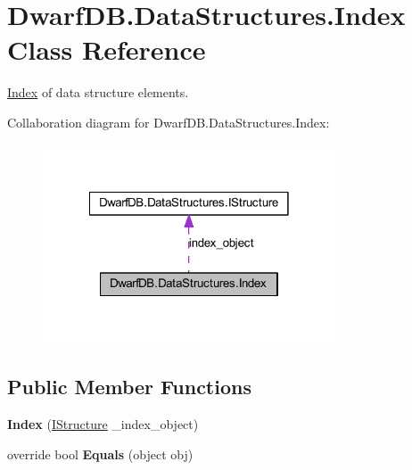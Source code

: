 \hypertarget{class_dwarf_d_b_1_1_data_structures_1_1_index}{
\section{DwarfDB.DataStructures.Index Class Reference}
\label{class_dwarf_d_b_1_1_data_structures_1_1_index}
}


\hyperlink{class_dwarf_d_b_1_1_data_structures_1_1_index}{Index} of data structure elements.  




Collaboration diagram for DwarfDB.DataStructures.Index:
\nopagebreak
\begin{figure}[H]
\begin{center}
\leavevmode
\includegraphics[width=246pt]{class_dwarf_d_b_1_1_data_structures_1_1_index__coll__graph}
\end{center}
\end{figure}
\subsection*{Public Member Functions}
\begin{DoxyCompactItemize}
\item 
\hypertarget{class_dwarf_d_b_1_1_data_structures_1_1_index_a2481d361d4dbf7cb81f094a834b93214}{
{\bfseries Index} (\hyperlink{interface_dwarf_d_b_1_1_data_structures_1_1_i_structure}{IStructure} \_\-index\_\-object)}
\label{class_dwarf_d_b_1_1_data_structures_1_1_index_a2481d361d4dbf7cb81f094a834b93214}

\item 
\hypertarget{class_dwarf_d_b_1_1_data_structures_1_1_index_aef1cd3ec762c296c9ced22ab8ed4ab12}{
override bool {\bfseries Equals} (object obj)}
\label{class_dwarf_d_b_1_1_data_structures_1_1_index_aef1cd3ec762c296c9ced22ab8ed4ab12}

\end{DoxyCompactItemize}
